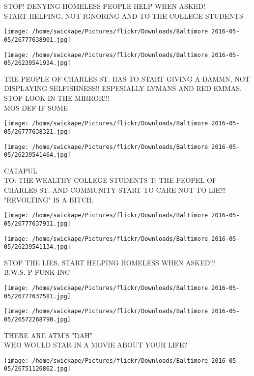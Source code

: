 \documentclass[10pt,letterpaper]{article}
\begin{document}
STOP! DENYING HOMELESS PEOPLE HELP WHEN ASKED!\\
START HELPING, NOT IGNORING  AND TO THE COLLEGE STUDENTS
\pagebreak

\texttt{[image: /home/swickape/Pictures/flickr/Downloads/Baltimore 2016-05-05/26777638901.jpg]}

\vspace{0.25in}
\texttt{[image: /home/swickape/Pictures/flickr/Downloads/Baltimore 2016-05-05/26239541934.jpg]}

THE PEOPLE OF CHARLES ST. HAS TO START GIVING A DAMMN, NOT DISPLAYING SELFISHNESS!! ESPESIALLY LYMANS AND RED EMMAS.  STOP LOOK IN THE MIRROR!!!\\
MOS DEF IF SOME
\pagebreak

\texttt{[image: /home/swickape/Pictures/flickr/Downloads/Baltimore 2016-05-05/26777638321.jpg]}

\vspace{0.25in}
\texttt{[image: /home/swickape/Pictures/flickr/Downloads/Baltimore 2016-05-05/26239541464.jpg]}

CATAPUL\\
TO: THE WEALTHY COLLEGE STUDENTS   T: THE PEOPEL OF CHARLES ST. AND COMMUNITY START TO CARE NOT TO LIE!!! "REVOLTING" IS A BITCH.
\pagebreak

\texttt{[image: /home/swickape/Pictures/flickr/Downloads/Baltimore 2016-05-05/26777637931.jpg]}

\vspace{0.25in}
\texttt{[image: /home/swickape/Pictures/flickr/Downloads/Baltimore 2016-05-05/26239541134.jpg]}

STOP THE LIES, START HELPING HOMELESS WHEN ASKED!!!\\
B.W.S. P{-}FUNK INC
\pagebreak

\texttt{[image: /home/swickape/Pictures/flickr/Downloads/Baltimore 2016-05-05/26777637581.jpg]}

\vspace{0.25in}
\texttt{[image: /home/swickape/Pictures/flickr/Downloads/Baltimore 2016-05-05/26572268790.jpg]}

THERE ARE ATM'S "DAH"\\
WHO WOULD STAR IN A MOVIE ABOUT YOUR LIFE?
\pagebreak

\texttt{[image: /home/swickape/Pictures/flickr/Downloads/Baltimore 2016-05-05/26751126862.jpg]}
\end{document}
